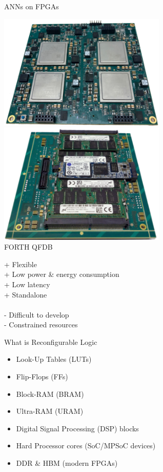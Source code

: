 \begin{frame}{ANNs on FPGAs}
	\begin{minipage}{0.4\textwidth}
		\centering
		\includegraphics[width=0.6\textwidth]{../Images/Hardware/QFDB-top.png}\\
		\includegraphics[width=0.6\textwidth]{../Images/Hardware/QFDB-bottom.png}\\
		FORTH QFDB
	\end{minipage}%
	\begin{minipage}{0.6\textwidth}
		+ Flexible\\
		+ Low power \& energy consumption\\
		+ Low latency\\
		+ Standalone\\\\
		- Difficult to develop\\
		- Constrained resources\\
	\end{minipage}
\end{frame}

\begin{frame}{What is Reconfigurable Logic}
	\begin{itemize}
		\item Look-Up Tables (LUTs)
		\item Flip-Flops (FFs)
		\item Block-RAM (BRAM)
		\item Ultra-RAM (URAM)
		\item Digital Signal Processing (DSP) blocks
		\item Hard Processor cores (SoC/MPSoC devices)
		\item DDR \& HBM (modern FPGAs)
	\end{itemize}
\end{frame}
